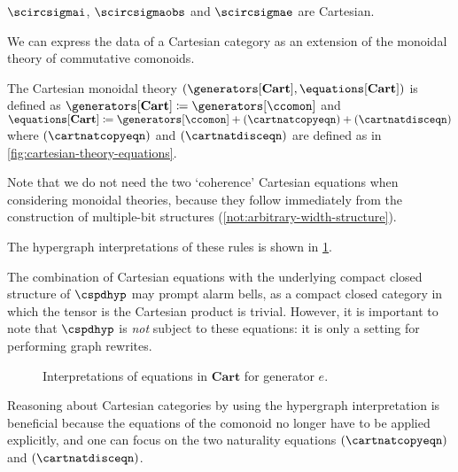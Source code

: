 \begin{corollary}
    \(\scircsigmai\), \(\scircsigmaobs\) and \(\scircsigmae\) are Cartesian.
\end{corollary}

We can express the data of a Cartesian category as an extension of the
monoidal theory of commutative comonoids.

\begin{definition}
    The Cartesian monoidal theory \(
    (\generators[\mathbf{Cart}], \equations[\mathbf{Cart}])
    \) is defined as \(
    \generators[\mathbf{Cart}] \coloneqq \generators[\ccomon]
    \) and \(
    \equations[\mathbf{Cart}]
    \coloneqq
    \generators[\ccomon] + (\cartnatcopyeqn) + (\cartnatdisceqn)
    \) where \((\cartnatcopyeqn)\) and \((\cartnatdisceqn)\) are defined as in
    \cref{fig:cartesian-theory-equations}.
\end{definition}

\begin{remark}
    Note that we do not need the two `coherence' Cartesian equations when
    considering monoidal theories, because they follow immediately from the
    construction of multiple-bit structures
    (\cref{not:arbitrary-width-structure}).
\end{remark}



The hypergraph interpretations of these rules is shown in
\cref{fig:cartesian-graphs}.

\begin{remark}
    The combination of Cartesian equations with the underlying compact closed
    structure of \(\cspdhyp\) may prompt alarm bells, as a compact closed
    category in which the tensor is the Cartesian product is trivial.
    However, it is important to note that \(\cspdhyp\) is \emph{not} subject to
    these equations: it is only a setting for performing graph
    rewrites.
\end{remark}

\begin{figure}
    \centering
    
    \qquad
    \raisebox{1em}{}
    \caption{
        Interpretations of equations in \(\mathbf{Cart}\) for
        generator \(e\).
    }
    \label{fig:cartesian-graphs}
\end{figure}

Reasoning about Cartesian categories by using the hypergraph interpretation is
beneficial because the equations of the comonoid no longer have to be applied
explicitly, and one can focus on the two naturality equations
\((\cartnatcopyeqn)\) and \((\cartnatdisceqn)\).

